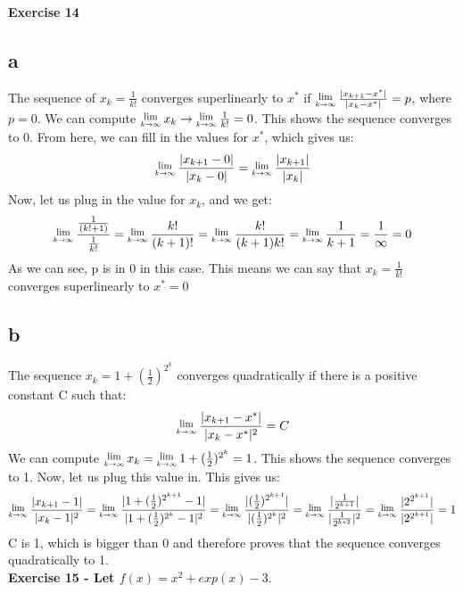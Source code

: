 \documentclass[12pt,letterpaper]{article}
\theoremstyle{definition}
\begin{document}
\newcommand{\Lim}[1]{\raisebox{0.5ex}{\scalebox{0.8}{$\displaystyle \lim_{#1}\;$}}}
\textbf{Exercise 14} 
\subsection*{a}
The sequence of $x_k = \frac{1}{k!}$ converges superlinearly to $x^*$ if
$\Lim{k \to \infty} \frac{|x_{k+1}-x^*|}{|x_k - x^*|} = p$, where $p=0$. \newline
We can compute $\Lim{k \to \infty} x_k \rightarrow \Lim{k \to \infty} \frac{1}{k!} = 0$. This shows the sequence converges to 0. \newline
From here, we can fill in the values for $x^*$, which gives us:
$$
\Lim{k \to \infty} \frac{|x_{k+1}-0|}{|x_k-0|} = \Lim{k \to \infty} \frac{|x_{k+1}|}{|x_k|}  
$$
Now, let us plug in the value for $x_k$, and we get:
$$
\Lim{k \to \infty} \frac{\frac{1}{(k!+1)}}{\frac{1}{k!}} = \Lim{k \to \infty} \frac{k!}{(k+1)!} = \Lim{k \to \infty} \frac{k!}{(k+1)k!} = \Lim{k \to \infty} \frac{1}{k+1} = \frac{1}{\infty} = 0
$$
As we can see, p is in 0 in this case. This means we can say that $x_k = \frac{1}{k!}$ converges superlinearly to $x^* = 0$

\subsection*{b}
The sequence $x_k = 1+ (\frac{1}{2})^{2^k}$ converges quadratically if there is a positive constant C such that:
$$
\Lim{k \to \infty} \frac{|x_{k+1} - x^*|}{|x_k - x^*|^2} = C
$$
We can compute $\Lim{k \to \infty} x_k = \Lim{k \to \infty} 1 + (\frac{1}{2})^{2^k} = 1$. This shows the sequence converges to 1. Now, let us plug this value in. This gives us:
$$
\Lim{k \to \infty}  \frac{|x_{k+1} - 1|}{|x_k - 1|^2} = \Lim{k \to \infty}  \frac{|1 + (\frac{1}{2})^{2^{k+1}}- 1|}{|1 +(\frac{1}{2})^{2^k} - 1|^2} =  \Lim{k \to \infty} \frac{|(\frac{1}{2})^{2^{k+1}}|}{|(\frac{1}{2})^{2^k}|^2} = \Lim{k \to \infty} \frac{|\frac{1}{2^{k+1}}|}{|\frac{1}{2^{k*2}}|^2} = \Lim{k \to \infty} \frac{|2^{2^{k+1}}|}{|2^{2^{k+1}}|} = 1
$$
C is 1, which is bigger than 0 and therefore proves that the sequence converges quadratically to 1.\\

\textbf{Exercise 15 -  Let $f(x) = x^2+exp(x)-3.$} 
\end{document}
